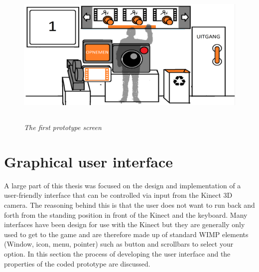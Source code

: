 \begin{figure}[H]
	\begin{center}
		\includegraphics[width=12.5cm, height=7cm]{figures/prototype_1_1_standard.png}
		\caption{\emph{The first prototype screen}}
		\label{first prototype}
	\end{center}
\end{figure}


\section{Graphical user interface}



A large part of this thesis was focused on the design and implementation of a user-friendly interface that can be controlled via input from the Kinect 3D camera. The reasoning behind this is that the user does not want to run back and forth from the standing position in front of the Kinect and the keyboard. Many interfaces have been design for use with the Kinect but they are generally only used to get to the game and are therefore made up of standard WIMP elements (Window, icon, menu, pointer) such as button and scrollbars to select your option. In this section the process of developing the user interface and the properties of the coded prototype are discussed.

